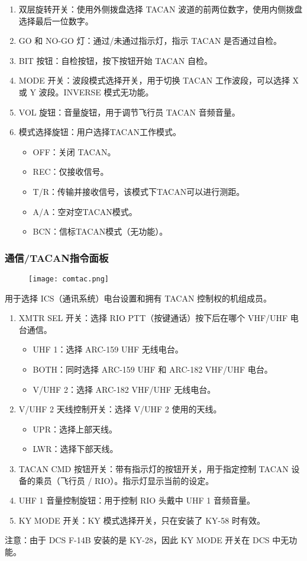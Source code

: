 \begin{enumerate}
	\item 双层旋转开关：使用外侧拨盘选择 TACAN 波道的前两位数字，使用内侧拨盘选择最后一位数字。
	\item GO 和 NO-GO 灯：通过/未通过指示灯，指示 TACAN 是否通过自检。
	\item BIT 按钮：自检按钮，按下按钮开始 TACAN 自检。
	\item MODE 开关：波段模式选择开关，用于切换 TACAN 工作波段，可以选择 X 或 Y 波段。INVERSE 模式无功能。
	\item VOL 旋钮：音量旋钮，用于调节飞行员 TACAN 音频音量。
	\item 模式选择旋钮：用户选择TACAN工作模式。
	      \begin{itemize}
		      \item OFF：关闭 TACAN。
		      \item REC：仅接收信号。
		      \item T/R：传输并接收信号，该模式下TACAN可以进行测距。
		      \item A/A：空对空TACAN模式。
		      \item BCN：信标TACAN模式（无功能）。
	      \end{itemize}
\end{enumerate}

\subsubsection{通信/TACAN指令面板}
\begin{figure}[htb]
	\centering
	\texttt{[image: comtac.png]}
\end{figure}
用于选择 ICS（通讯系统）电台设置和拥有 TACAN 控制权的机组成员。

\begin{enumerate}
	\item XMTR SEL 开关：选择 RIO PTT（按键通话）按下后在哪个 VHF/UHF 电台通信。
	      \begin{itemize}
		      \item UHF 1：选择 ARC-159 UHF 无线电台。
		      \item BOTH：同时选择 ARC-159 UHF 和 ARC-182 VHF/UHF 电台。
		      \item V/UHF 2：选择 ARC-182 VHF/UHF 无线电台。
	      \end{itemize}
	\item V/UHF 2 天线控制开关：选择 V/UHF 2 使用的天线。
	      \begin{itemize}
		      \item UPR：选择上部天线。
		      \item LWR：选择下部天线。
	      \end{itemize}
	\item TACAN CMD 按钮开关：带有指示灯的按钮开关，用于指定控制 TACAN 设备的乘员（飞行员 / RIO）。指示灯显示当前的设定。
	\item UHF 1 音量控制旋钮：用于控制 RIO 头戴中 UHF 1 音频音量。
	\item KY MODE 开关：KY 模式选择开关，只在安装了 KY-58 时有效。
\end{enumerate}
注意：由于 DCS F-14B 安装的是 KY-28，因此 KY MODE 开关在 DCS 中无功能。


